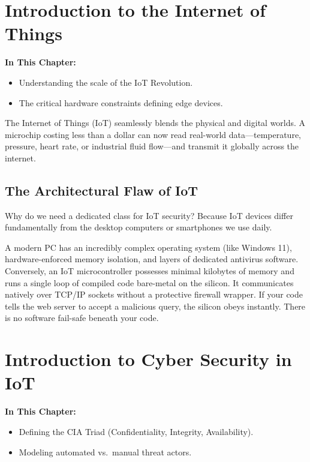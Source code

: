 \chapter{Introduction to the Internet of Things}

\textbf{In This Chapter:}
\begin{itemize}
    \item Understanding the scale of the IoT Revolution.
    \item The critical hardware constraints defining edge devices.
\end{itemize}

The Internet of Things (IoT) seamlessly blends the physical and digital worlds. A microchip costing less than a dollar can now read real-world data—temperature, pressure, heart rate, or industrial fluid flow—and transmit it globally across the internet. 

\section{The Architectural Flaw of IoT}
Why do we need a dedicated class for IoT security? Because IoT devices differ fundamentally from the desktop computers or smartphones we use daily. 

A modern PC has an incredibly complex operating system (like Windows 11), hardware-enforced memory isolation, and layers of dedicated antivirus software. Conversely, an IoT microcontroller possesses minimal kilobytes of memory and runs a single loop of compiled code bare-metal on the silicon. It communicates natively over TCP/IP sockets without a protective firewall wrapper. If your code tells the web server to accept a malicious query, the silicon obeys instantly. There is no software fail-safe beneath your code.

\chapter{Introduction to Cyber Security in IoT}

\textbf{In This Chapter:}
\begin{itemize}
    \item Defining the CIA Triad (Confidentiality, Integrity, Availability).
    \item Modeling automated vs.\ manual threat actors.
\end{itemize}

